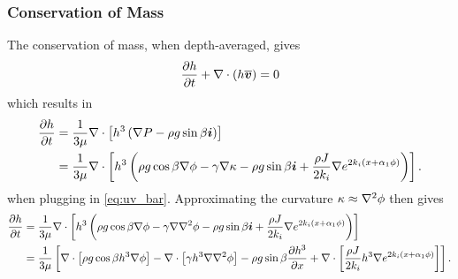 \subsubsection{Conservation of Mass}
The conservation of mass, when depth-averaged, gives 
\begin{align*}
    \frac{\partial h}{\partial t} + \nabla \cdot \left( h\overline{\boldsymbol{v}} \right) = 0
\end{align*}
which results in 
\begin{align}
    \begin{aligned}
    \frac{\partial h}{\partial t} &= \frac{1}{3\mu} \nabla \cdot \left[ h^3 \left( \nabla P - \rho g \sin \beta \boldsymbol{i} \right) \right]\\
    &= \frac{1}{3\mu} \nabla \cdot \left[ h^3 \left( \rho g \cos\beta \nabla \phi - \gamma\nabla\kappa - \rho g \sin \beta \boldsymbol{i} + \frac{\rho J}{2k_i}\nabla e^{2k_i \left( x + \alpha_1 \phi \right)}  \right) \right]. 
    \end{aligned}
    \label{eq:thin_film_nokappa}
\end{align}
when plugging in \cref{eq:uv_bar}. Approximating the curvature $\kappa \approx \nabla^2 \phi$ then gives 
\begin{align}
    \begin{aligned}
    \frac{\partial h}{\partial t} &= \frac{1}{3\mu} \nabla \cdot \left[ h^3 \left( \rho g \cos\beta \nabla \phi - \gamma\nabla\nabla^2\phi - \rho g \sin \beta \boldsymbol{i} + \frac{\rho J}{2k_i}\nabla e^{2k_i \left( x + \alpha_1 \phi \right)} \right) \right]\\
    &= \frac{1}{3\mu} \left[  \nabla \cdot \left[ \rho g \cos \beta h^3 \nabla \phi \right] - \nabla \cdot \left[ \gamma h^3 \nabla\nabla^2\phi \right] - \rho g \sin\beta \frac{\partial h^3}{\partial x} + \nabla \cdot \left[ \frac{\rho J}{2k_i}h^3\nabla e^{2k_i \left( x + \alpha_1 \phi \right)} \right] \right].
    \end{aligned}
    \label{eq:thin_film_dim}
\end{align}


